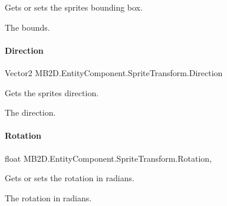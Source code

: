 Gets or sets the sprites bounding box. 

The bounds.\hypertarget{class_m_b2_d_1_1_entity_component_1_1_sprite_transform_a0cd51eee71ba1b1f548e0950c05a8e12}{}\label{class_m_b2_d_1_1_entity_component_1_1_sprite_transform_a0cd51eee71ba1b1f548e0950c05a8e12} 
\paragraph{\texorpdfstring{Direction}{Direction}}
{\footnotesize\ttfamily Vector2 M\+B2\+D.\+Entity\+Component.\+Sprite\+Transform.\+Direction\hspace{0.3cm}{\ttfamily [get]}}



Gets the sprites direction. 

The direction.\hypertarget{class_m_b2_d_1_1_entity_component_1_1_sprite_transform_a6220a2c6ca43613d77065ec9eddc99dd}{}\label{class_m_b2_d_1_1_entity_component_1_1_sprite_transform_a6220a2c6ca43613d77065ec9eddc99dd} 
\paragraph{\texorpdfstring{Rotation}{Rotation}}
{\footnotesize\ttfamily float M\+B2\+D.\+Entity\+Component.\+Sprite\+Transform.\+Rotation\hspace{0.3cm}{\ttfamily [get]}, {\ttfamily [set]}}



Gets or sets the rotation in radians. 

The rotation in radians.\hypertarget{class_m_b2_d_1_1_entity_component_1_1_sprite_transform_a31edaa3c4ce6d37d74b639032be4f845}{}\label{class_m_b2_d_1_1_entity_component_1_1_sprite_transform_a31edaa3c4ce6d37d74b639032be4f845} 
